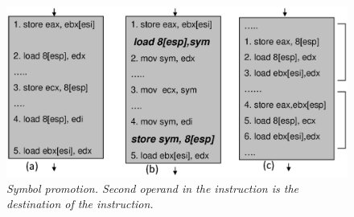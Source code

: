 \begin{figure}[t]
{
\vspace{-0.2in}
\centering
\includegraphics[width=0.7\linewidth]{figures/EPS/pathcfg.eps}
\vspace{-2ex}
\caption{\textit{Symbol promotion. Second operand in the instruction is the destination of the instruction. }}
\label{fig:PromExample}
}
\vspace{-3ex}
\end{figure}




